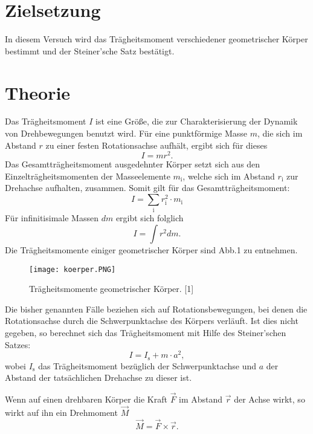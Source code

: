 \section{Zielsetzung}
\label{sec:Zielsetzung}
In diesem Versuch wird das Trägheitsmoment verschiedener
geometrischer Körper bestimmt und der Steiner'sche Satz bestätigt.



\section{Theorie}
\label{sec:Theorie}

Das Trägheitsmoment $I$ ist eine Größe, die zur Charakterisierung
der Dynamik von Drehbewegungen benutzt wird. Für eine
punktförmige Masse $m$, die sich im Abstand $r$ zu einer festen
Rotationsachse aufhält, ergibt sich für dieses
\begin{equation}
I = mr^2.
\end{equation}
Das Gesamtträgheitsmoment ausgedehnter Körper setzt sich aus den
Einzelträgheitsmomenten der Masseelemente $m_{\text{i}}$,
welche sich im Abstand $r_{\text{i}}$ zur Drehachse aufhalten,
zusammen. Somit gilt für das Gesamtträgheitsmoment:
\begin{equation}
I = \sum_{\text{i}} r_{\text{i}}^2 \cdot m_{\text{i}}
\end{equation}
Für infinitisimale Massen $dm$ ergibt sich folglich
\begin{equation}
I = \int r^2 dm.
\end{equation}
Die Trägheitsmomente einiger geometrischer Körper sind Abb.1 zu
entnehmen.
\begin{figure}[H]
\centering
\caption{Trägheitsmomente geometrischer Körper. [1]}
\texttt{[image: koerper.PNG]}
\label{fig:koerper}
\end{figure}
Die bisher genannten Fälle beziehen sich auf Rotationsbewegungen,
bei denen die Rotationsachse durch die Schwerpunktachse des
Körpers verläuft. Ist dies nicht gegeben, so berechnet sich
das Trägheitsmoment mit Hilfe des Steiner'schen Satzes:
\begin{equation*}
I = I_{\text{s}} + m \cdot a^2,
\end{equation*}
wobei $I_{\text{s}}$ das Trägheitsmoment bezüglich der
Schwerpunktachse und $a$ der Abstand der
tatsächlichen Drehachse zu dieser ist.
\par
Wenn auf einen drehbaren Körper die Kraft $\vec{F}$ im Abstand
$\vec{r}$ der Achse wirkt, so wirkt auf ihn ein Drehmoment
$\vec{M}$
\begin{equation}
\vec{M} = \vec{F} \times \vec{r}.
\end{equation}
